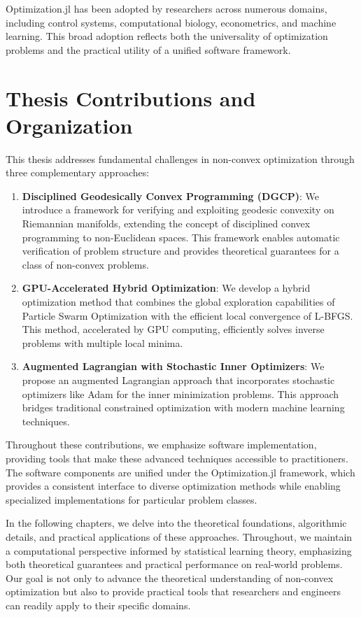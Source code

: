 Optimization.jl has been adopted by researchers across numerous domains, including control systems, computational biology, econometrics, and machine learning. This broad adoption reflects both the universality of optimization problems and the practical utility of a unified software framework.

\section{Thesis Contributions and Organization}

This thesis addresses fundamental challenges in non-convex optimization through three complementary approaches:

\begin{enumerate}
\item \textbf{Disciplined Geodesically Convex Programming (DGCP)}: We introduce a framework for verifying and exploiting geodesic convexity on Riemannian manifolds, extending the concept of disciplined convex programming to non-Euclidean spaces. This framework enables automatic verification of problem structure and provides theoretical guarantees for a class of non-convex problems.

\item \textbf{GPU-Accelerated Hybrid Optimization}: We develop a hybrid optimization method that combines the global exploration capabilities of Particle Swarm Optimization with the efficient local convergence of L-BFGS. This method, accelerated by GPU computing, efficiently solves inverse problems with multiple local minima.

\item \textbf{Augmented Lagrangian with Stochastic Inner Optimizers}: We propose an augmented Lagrangian approach that incorporates stochastic optimizers like Adam for the inner minimization problems. This approach bridges traditional constrained optimization with modern machine learning techniques.
\end{enumerate}

Throughout these contributions, we emphasize software implementation, providing tools that make these advanced techniques accessible to practitioners. The software components are unified under the Optimization.jl framework, which provides a consistent interface to diverse optimization methods while enabling specialized implementations for particular problem classes.

In the following chapters, we delve into the theoretical foundations, algorithmic details, and practical applications of these approaches. Throughout, we maintain a computational perspective informed by statistical learning theory, emphasizing both theoretical guarantees and practical performance on real-world problems. Our goal is not only to advance the theoretical understanding of non-convex optimization but also to provide practical tools that researchers and engineers can readily apply to their specific domains.
